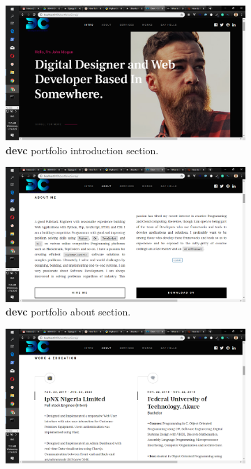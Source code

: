 \begin{itemize}
	\begin{figure}[!htbp]
		\centering
		\begin{subfigure}[b]{0.45\textwidth}
			\centering
			\includegraphics[width=\linewidth]{./devcportprofile}
			\caption{\textbf{devc} portfolio introduction section.}
		\end{subfigure}
		\hfill
		\begin{subfigure}[b]{0.45\textwidth}
			\centering
			\includegraphics[width=\linewidth]{./devcportabout}
			\caption{\textbf{devc} portfolio about section.}
		\end{subfigure}
		\medskip
		\begin{subfigure}[b]{0.45\textwidth}
			\centering
			\includegraphics[width=\linewidth]{./devcportwork}

\end{subfigure}
\end{figure}
\end{itemize}
